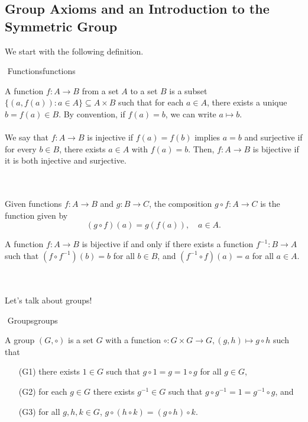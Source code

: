     \subsection{Group Axioms and an Introduction to the Symmetric Group}

    We start with the following definition.
    \begin{definition}{\Stop\,\,Functions}{functions}
        
        A function \(f:A\to B\) from a set \(A\) to a set \(B\) is a subset \(\{(a,f(a)):a\in A\}\subseteq A\times B\) such that for each \(a\in A\), there exists a unique \(b=f(a)\in B\). By convention, if \(f(a)=b\), we can write \(a\mapsto b\).
        \\
        \\
        We say that \(f:A\to B\) is injective if \(f(a)=f(b)\) implies \(a=b\) and surjective if for every \(b\in B\), there exists \(a\in A\) with \(f(a)=b\). Then, \(f:A\to B\) is bijective if it is both injective and surjective.

    \end{definition}
    \vphantom
    \\
    \\
    Given functions \(f:A\to B\) and \(g:B\to C\), the composition \(g\circ f:A\to C\) is the function given by
    \begin{equation*}
        (g\circ f)(a)=g(f(a)), \quad a\in A.
    \end{equation*}
    \begin{remark*}
        A function \(f:A\to B\) is bijective if and only if there exists a function \(f^{-1}:B\to A\) such that \((f\circ f^{-1})(b)=b\) for all \(b\in B\), and \((f^{-1}\circ f)(a)=a\) for all \(a\in A\).
    \end{remark*}
    \vphantom
    \\
    \\
    Let's talk about groups!
    \begin{definition}{\Stop\,\,Groups}{groups}

        A group \((G,\circ)\) is a set \(G\) with a function \(\circ: G\times G\to G, (g,h)\mapsto g\circ h\) such that
        \begin{enumerate}
            \item[(G1)] there exists \(1\in G\) such that \(g\circ 1=g=1\circ g\) for all \(g\in G\),
            \item[(G2)] for each \(g\in G\) there exists \(g^{-1}\in G\) such that \(g\circ g^{-1}=1=g^{-1}\circ g\), and
            \item[(G3)] for all \(g,h,k\in G\), \(g\circ (h\circ k)=(g\circ h)\circ k\).  
        \end{enumerate}
        
    \end{definition}
